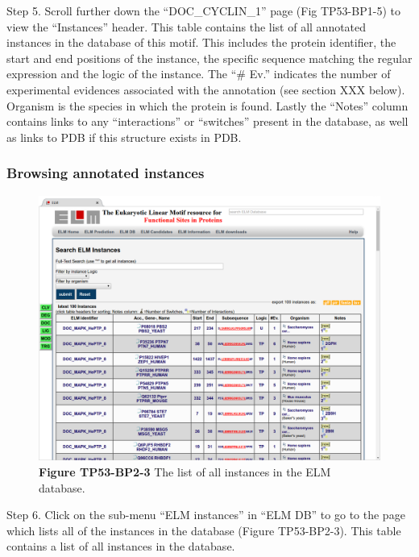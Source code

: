 Step 5. Scroll further down the ``DOC\_CYCLIN\_1'' page (Fig TP53-BP1-5)
to view the ``Instances'' header. This table contains the list of all
annotated instances in the database of this motif. This includes the
protein identifier, the start and end positions of the instance, the
specific sequence matching the regular expression and the logic of the
instance. The ``\# Ev.'' indicates the number of experimental evidences
associated with the annotation (see section XXX below). Organism is the
species in which the protein is found. Lastly the ``Notes'' column
contains links to any ``interactions'' or ``switches'' present in the
database, as well as links to PDB if this structure exists in PDB.

\subsubsection{Browsing annotated
instances}\label{browsing-annotated-instances}

\begin{figure}[h!]
\centering
\includegraphics[width=\textwidth]{Figures/TP53_2/instances.png} 
\caption{
\textbf{Figure TP53-BP2-3}
The list of all instances in the ELM database.
}
\end{figure}

Step 6. Click on the sub-menu ``ELM instances'' in ``ELM DB'' to go to
the page which lists all of the instances in the database (Figure
TP53-BP2-3). This table contains a list of all instances in the
database.


